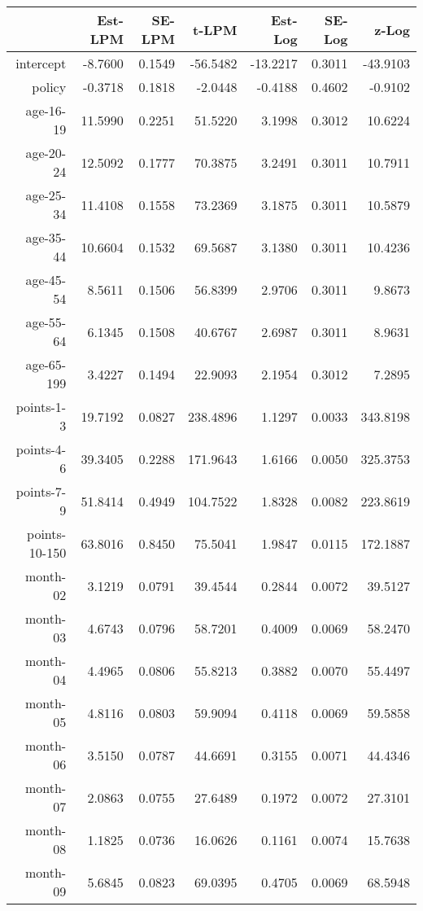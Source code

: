 \documentclass[10pt]{article}
\begin{document}
\begin{table}[ht]
\centering
\begin{tabular}{rrrrrrr}
  \hline
 & Est-LPM & SE-LPM & t-LPM & Est-Log & SE-Log & z-Log \\ 
  \hline
intercept & -8.7600 & 0.1549 & -56.5482 & -13.2217 & 0.3011 & -43.9103 \\ 
  policy & -0.3718 & 0.1818 & -2.0448 & -0.4188 & 0.4602 & -0.9102 \\ 
  age-16-19 & 11.5990 & 0.2251 & 51.5220 & 3.1998 & 0.3012 & 10.6224 \\ 
  age-20-24 & 12.5092 & 0.1777 & 70.3875 & 3.2491 & 0.3011 & 10.7911 \\ 
  age-25-34 & 11.4108 & 0.1558 & 73.2369 & 3.1875 & 0.3011 & 10.5879 \\ 
  age-35-44 & 10.6604 & 0.1532 & 69.5687 & 3.1380 & 0.3011 & 10.4236 \\ 
  age-45-54 & 8.5611 & 0.1506 & 56.8399 & 2.9706 & 0.3011 & 9.8673 \\ 
  age-55-64 & 6.1345 & 0.1508 & 40.6767 & 2.6987 & 0.3011 & 8.9631 \\ 
  age-65-199 & 3.4227 & 0.1494 & 22.9093 & 2.1954 & 0.3012 & 7.2895 \\ 
  points-1-3 & 19.7192 & 0.0827 & 238.4896 & 1.1297 & 0.0033 & 343.8198 \\ 
  points-4-6 & 39.3405 & 0.2288 & 171.9643 & 1.6166 & 0.0050 & 325.3753 \\ 
  points-7-9 & 51.8414 & 0.4949 & 104.7522 & 1.8328 & 0.0082 & 223.8619 \\ 
  points-10-150 & 63.8016 & 0.8450 & 75.5041 & 1.9847 & 0.0115 & 172.1887 \\ 
  month-02 & 3.1219 & 0.0791 & 39.4544 & 0.2844 & 0.0072 & 39.5127 \\ 
  month-03 & 4.6743 & 0.0796 & 58.7201 & 0.4009 & 0.0069 & 58.2470 \\ 
  month-04 & 4.4965 & 0.0806 & 55.8213 & 0.3882 & 0.0070 & 55.4497 \\ 
  month-05 & 4.8116 & 0.0803 & 59.9094 & 0.4118 & 0.0069 & 59.5858 \\ 
  month-06 & 3.5150 & 0.0787 & 44.6691 & 0.3155 & 0.0071 & 44.4346 \\ 
  month-07 & 2.0863 & 0.0755 & 27.6489 & 0.1972 & 0.0072 & 27.3101 \\ 
  month-08 & 1.1825 & 0.0736 & 16.0626 & 0.1161 & 0.0074 & 15.7638 \\ 
  month-09 & 5.6845 & 0.0823 & 69.0395 & 0.4705 & 0.0069 & 68.5948 \\ 

\end{tabular}
\end{table}
\end{document}
